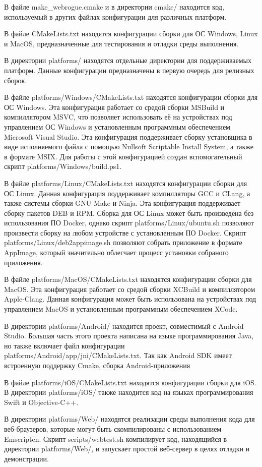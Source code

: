 В файле make\_webrogue.cmake и в директории cmake/ находится код, используемый в других файлах конфигурации для различных платформ.

В файле CMakeLists.txt находятся конфигурации сборки для ОС Windows, Linux и MacOS, предназначенные для тестирования и отладки среды выполнения.

В директории platforms/ находятся отдельные директории для поддерживаемых платформ. Данные конфигурации предназначены в первую очередь для релизных сборок.

В файле platforms/Windows/CMakeLists.txt находятся конфигурации сборки для ОС Windows. 
Эта конфигурация работает со средой сборки MSBuild и компиллятором MSVC, что позволяет использовать её на устройствах под управлением ОС Windows и установленным программным обеспечением Microsoft Visual Studio.
Эта конфигурация поддерживает сборку установщика в виде исполняемого файла с помощью Nullsoft Scriptable Install System, а также в формате MSIX.
Для работы с этой конфигурацией создан вспомогательный скрипт platforms/Windows/build.ps1.

В файле platforms/Linux/CMakeLists.txt находятся конфигурации сборки для ОС Linux. 
Данная конфигурация поддерживает компилляторы GCC и CLang, а также системы сборки GNU Make и Ninja.
Эта конфигурация поддерживает сборку пакетов DEB и RPM.
Сборка для ОС Linux может быть произведена без использования ПО Docker, однако скрипт platforms/Linux/ubuntu.sh позволяют произвести сборку на любом устройстве с установленным ПО Docker.
Скрипт platforms/Linux/deb2appimage.sh позволяют собрать приложение в формате AppImage, который значительно облегчает процесс установки собраного приложения.

В файле platforms/MacOS/CMakeLists.txt находятся конфигурации сборки для MacOS. 
Эта конфигурация работает со средой сборки XCBuild и компиллятором Apple-Clang.
Данная конфигурация может быть использована на устройствах под управлением MacOS и установленным программным обеспечением XCode.

В директории platforms/Android/ находится проект, совместимый с Android Studio.
Большая часть этого проекта написана на языке программирования Java, но также включает файл конфигурации platforms/Android/app/jni/CMakeLists.txt.
Так как Android SDK имеет встроенную поддержку Cmake, сборка Android-приложения

В файле platforms/iOS/CMakeLists.txt находятся конфигурации сборки для iOS. 
В директории platforms/iOS/ также находится код на языках программирования Swift и Objective-C++.

В директории platforms/Web/ находятся реализации среды выполнения кода для веб-браузеров, которые могут быть скомпилированы с использованием Emscripten.
Скрипт scripts/webtest.sh компилирует код, находящийся в директории platforms/Web/, и запускает простой веб-сервер в целях отладки и демонстрации.
